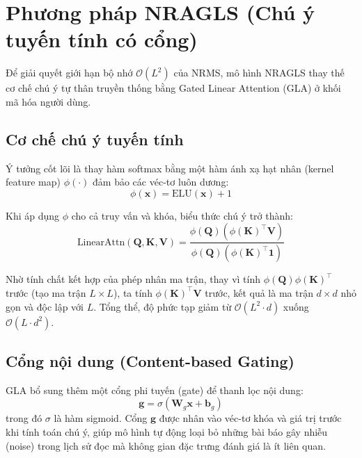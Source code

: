 \documentclass[../BTL.tex]{subfiles}
\begin{document}
\section{Phương pháp NRAGLS (Chú ý tuyến tính có cổng)}

Để giải quyết giới hạn bộ nhớ $\mathcal{O}(L^2)$ của NRMS, mô hình NRAGLS thay thế cơ chế chú ý tự thân truyền thống bằng Gated Linear Attention (GLA) \cite{yang2023gla,katharopoulos2020linear} ở khối mã hóa người dùng.

\subsection{Cơ chế chú ý tuyến tính}

Ý tưởng cốt lõi là thay hàm softmax bằng một hàm ánh xạ hạt nhân (kernel feature map) $\phi(\cdot)$ đảm bảo các véc-tơ luôn dương:
\begin{equation}
    \phi(\mathbf{x}) = \text{ELU}(\mathbf{x}) + 1
\end{equation}

Khi áp dụng $\phi$ cho cả truy vấn và khóa, biểu thức chú ý trở thành:
\begin{equation}
    \text{LinearAttn}(\mathbf{Q}, \mathbf{K}, \mathbf{V}) = \frac{\phi(\mathbf{Q}) \left(\phi(\mathbf{K})^{\top} \mathbf{V}\right)}{\phi(\mathbf{Q}) \left(\phi(\mathbf{K})^{\top} \mathbf{1}\right)}
\end{equation}

Nhờ tính chất kết hợp của phép nhân ma trận, thay vì tính $\phi(\mathbf{Q})\phi(\mathbf{K})^{\top}$ trước (tạo ma trận $L \times L$), ta tính $\phi(\mathbf{K})^{\top}\mathbf{V}$ trước, kết quả là ma trận $d \times d$ nhỏ gọn và độc lập với $L$. Tổng thể, độ phức tạp giảm từ $\mathcal{O}(L^2 \cdot d)$ xuống $\mathcal{O}(L \cdot d^2)$.

\subsection{Cổng nội dung (Content-based Gating)}

GLA bổ sung thêm một cổng phi tuyến (gate) để thanh lọc nội dung:
\begin{equation}
    \mathbf{g} = \sigma(\mathbf{W}_g \mathbf{x} + \mathbf{b}_g)
\end{equation}
trong đó $\sigma$ là hàm sigmoid. Cổng $\mathbf{g}$ được nhân vào véc-tơ khóa và giá trị trước khi tính toán chú ý, giúp mô hình tự động loại bỏ những bài báo gây nhiễu (noise) trong lịch sử đọc mà không gian đặc trưng đánh giá là ít liên quan.
\end{document}

